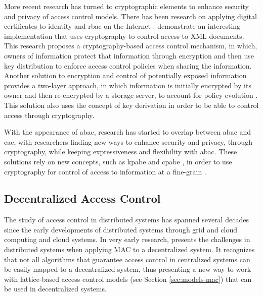 More recent research has turned to cryptographic elements to enhance security and privacy of access control models. There has been research on applying digital certificates to identity \cite{park_binding_2000} and \gls{rbac} on the Internet \cite{park_rbac_1999}. \citeauthor{miklau_controlling_2003} \cite{miklau_controlling_2003} demonstrate an interesting implementation that uses cryptography to control access to XML documents. This research proposes a cryptography-based access control mechanism, in which, owners of information protect that information through encryption and then use key distribution to enforce access control policies when sharing the information. Another solution to encryption and control of potentially exposed information provides a two-layer approach, in which information is initially encrypted by its owner and then re-encrypted by a storage server, to account for policy evolution \cite{di_vimercati_over-encryption:_2007}. This solution also uses the concept of key derivation in order to be able to control access through cryptography.

With the appearance of \gls{abac}, research has started to overlap between \gls{abac} and \gls{cac}, with researchers finding new ways to enhance security and privacy, through cryptography, while keeping expressiveness and flexibility with \gls{abac}. These solutions rely on new concepts, such as \gls{kpabe} \cite{goyal_attribute-based_2006} and \gls{cpabe} \cite{bethencourt_ciphertext-policy_2007}, in order to use cryptography for control of access to information at a fine-grain \cite{wan_hasbe:_2012, ruj_privacy_2012, wang_hierarchical_2010}.

\subsection{Decentralized Access Control}

The study of access control in distributed systems has spanned several decades since the early developments of distributed systems through grid and cloud computing and cloud systems. In very early research, \citeauthor{karger_non-discretionary_1977} \cite{karger_non-discretionary_1977} presents the challenges in distributed systems when applying MAC to a decentralized system. It recognizes that not all algorithms that guarantee access control in centralized systems can be easily mapped to a decentralized system, thus presenting a new way to work with lattice-based access control models (see Section \ref{sec:models-mac}) that can be used in decentralized systems.

